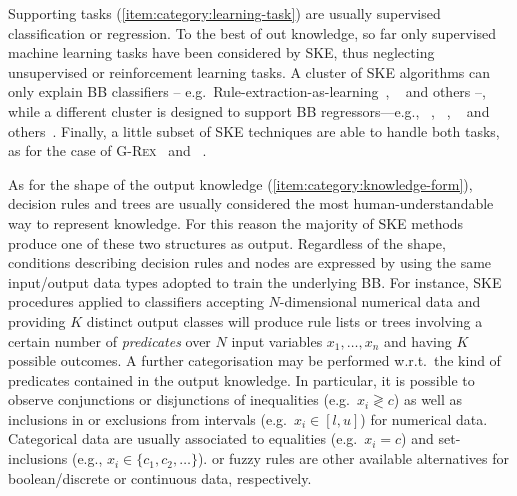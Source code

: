 \documentclass[
]{ceurart}
\begin{document}
Supporting tasks (\cref{item:category:learning-task}) are usually supervised classification or regression.
%
To the best of out knowledge, so far only supervised machine learning tasks have been considered by SKE, thus neglecting unsupervised or reinforcement learning tasks.
%
A cluster of SKE algorithms can only explain BB classifiers -- e.g.\ Rule-extraction-as-learning~\cite{craven1994using}, \trepan~\cite{craven1996extracting} and others \cite{barakat2005eclectic,martens2007comprehensible} --, while a different cluster is designed to support BB regressors---e.g., \iter~\cite{huysmans2006iter}, \gridex~\cite{gridex-extraamas2021}, \gridrex{}~\cite{gridrex-kr2022} and others~\cite{setiono2002extraction,schmitz1999ann,saito2002extracting}.
%
Finally, a little subset of SKE techniques are able to handle both tasks, as for the case of \textsc{G-Rex}~\cite{grex-icdm2008} and \cart~\cite{breiman1984classification}.

As for the shape of the output knowledge (\cref{item:category:knowledge-form}), decision rules \cite{freitas2014comprehensible,huysmans2011empirical,murphy1991id2} and trees \cite{quinlan1993c4,simplifyingdt-ijmms27} are usually considered the most human-understandable way to represent knowledge.
%
For this reason the majority of SKE methods produce one of these two structures as output.
%
Regardless of the shape, conditions describing decision rules and nodes are expressed by using the same input/output data types adopted to train the underlying BB.
%
For instance, SKE procedures applied to classifiers accepting $N$-dimensional numerical data and providing $K$ distinct output classes will produce rule lists or trees involving a certain number of \emph{predicates} over $N$ input variables $x_1, \ldots, x_n$ and having $K$ possible outcomes.
%
A further categorisation may be performed w.r.t.\ the kind of predicates contained in the output knowledge.
%
In particular, it is possible to observe conjunctions or disjunctions of inequalities (e.g.\ $x_i \gtrless c$) as well as inclusions in or exclusions from intervals (e.g.\ $x_i \in [l, u]$) for numerical data.
%
Categorical data are usually associated to equalities (e.g.\ $x_i = c$) and set-inclusions (e.g., $x_i \in \{c_1, c_2, \ldots \}$).
%
\mofn{} or fuzzy rules are other available alternatives for boolean/discrete or continuous data, respectively.
\end{document}
